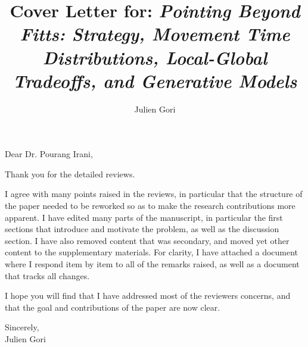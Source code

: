 \documentclass{article}
\title{Cover Letter for: \textit{Pointing Beyond Fitts: Strategy, Movement Time Distributions, Local-Global Tradeoffs, and Generative Models}}
\author{Julien Gori}
\begin{document}
\maketitle


Dear Dr. Pourang Irani,

\vspace{2\baselineskip}

Thank you for the detailed reviews.

\vspace{\baselineskip}

I agree with many points raised in the reviews, in particular that the structure of the paper needed to be reworked so as to make the research contributions more apparent.
I have edited many parts of the manuscript, in particular the first sections that introduce and motivate the problem, as well as the discussion section. I have also removed content that was secondary, and moved yet other content to the supplementary materials. For clarity, I have attached a document where I respond item by item to all of the remarks raised, as well as a document that tracks all changes.

I hope you will find that I have addressed most of the reviewers concerns, and that the goal and contributions of the paper are now clear. 

\begin{flushright}
Sincerely,\\
Julien Gori
\end{flushright}
\end{document}

